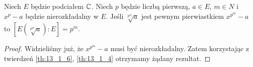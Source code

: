   \cite[Twierdzenie 13.1.4]{dum04}

\begin{lemma}
  Niech $E$ będzie podciałem $\mathbb{C}$. Niech $p$ będzie liczbą pierwszą, $a \in E$,
  $m \in N$ i $x^p - a$ będzie nierozkładalny w $E$.
  Jeśli $\sqrt[p^m]{a}$ jest pewnym pierwiastkiem $x^{p^m} - a$ to
  $\left[E \left(\sqrt[p^m]{a} \right) : E \right] = p^m$.
  \label{lem:root_extension}
\end{lemma}
\begin{proof}
  Widzieliśmy już, że $x^{p^m} - a$ musi być nierozkładalny. Zatem korzystając z
  twierdzeń \ref{th:13_1_6}, \ref{th:13_1_4} otrzymamy żądany rezultat.
\end{proof}
